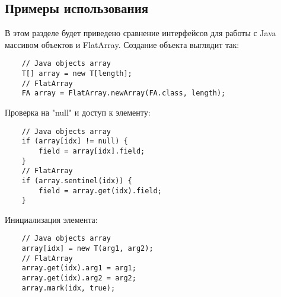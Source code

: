 \subsection{Примеры использования}
В этом разделе будет приведено сравнение интерфейсов для работы с Java массивом объектов и FlatArray. Создание объекта выглядит так:
\begin{lstlisting}
	// Java objects array
	T[] array = new T[length];
	// FlatArray
	FA array = FlatArray.newArray(FA.class, length);
\end{lstlisting}
Проверка на "null" и доступ к элементу:
\begin{lstlisting}
	// Java objects array
	if (array[idx] != null) {
		field = array[idx].field;
	}
	// FlatArray
	if (array.sentinel(idx)) {
		field = array.get(idx).field;
	}
\end{lstlisting}
Инициализация элемента:
\begin{lstlisting}
	// Java objects array
	array[idx] = new T(arg1, arg2);
	// FlatArray
	array.get(idx).arg1 = arg1;
	array.get(idx).arg2 = arg2;
	array.mark(idx, true);
\end{lstlisting}

\clearpage
